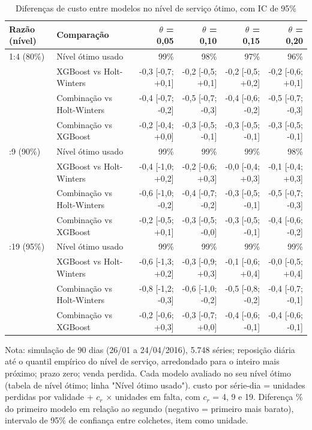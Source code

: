 \begin{table}[htbp]
\centering
\small
\caption{Diferenças de custo entre modelos no nível de serviço ótimo, com IC de 95\%}
\label{tab:sim_diferencas_otimo}
\begin{tabular}{llrrrr}
\toprule
Razão (nível) & Comparação & $\theta$ = 0,05 & $\theta$ = 0,10 & $\theta$ = 0,15 & $\theta$ = 0,20 \\
\midrule
1:4 (80\%) & Nível ótimo usado & 99\% & 98\% & 97\% & 96\% \\
 & XGBoost vs Holt-Winters & -0,3 [-0,7; +0,1] & -0,2 [-0,5; +0,1] & -0,2 [-0,5; +0,2] & -0,2 [-0,6; +0,1] \\
 & Combinação vs Holt-Winters & -0,4 [-0,7; -0,2] & -0,5 [-0,7; -0,3] & -0,4 [-0,6; -0,2] & -0,5 [-0,7; -0,3] \\
 & Combinação vs XGBoost & -0,2 [-0,4; +0,0] & -0,3 [-0,5; -0,1] & -0,3 [-0,5; -0,1] & -0,3 [-0,5; -0,1] \\
\addlinespace
1:9 (90\%) & Nível ótimo usado & 99\% & 99\% & 99\% & 98\% \\
 & XGBoost vs Holt-Winters & -0,4 [-1,0; +0,2] & -0,2 [-0,6; +0,3] & -0,0 [-0,4; +0,3] & -0,1 [-0,4; +0,3] \\
 & Combinação vs Holt-Winters & -0,6 [-1,0; -0,2] & -0,4 [-0,7; -0,2] & -0,3 [-0,5; -0,1] & -0,5 [-0,7; -0,3] \\
 & Combinação vs XGBoost & -0,2 [-0,5; +0,1] & -0,3 [-0,5; -0,0] & -0,3 [-0,5; -0,1] & -0,4 [-0,6; -0,2] \\
\addlinespace
1:19 (95\%) & Nível ótimo usado & 99\% & 99\% & 99\% & 99\% \\
 & XGBoost vs Holt-Winters & -0,6 [-1,3; +0,2] & -0,3 [-0,9; +0,3] & -0,1 [-0,6; +0,4] & -0,0 [-0,5; +0,4] \\
 & Combinação vs Holt-Winters & -0,8 [-1,2; -0,3] & -0,6 [-1,0; -0,2] & -0,5 [-0,8; -0,2] & -0,4 [-0,7; -0,1] \\
 & Combinação vs XGBoost & -0,2 [-0,6; +0,3] & -0,3 [-0,7; +0,0] & -0,4 [-0,6; -0,1] & -0,4 [-0,6; -0,1] \\
\bottomrule
\end{tabular}
\par\smallskip
{\footnotesize Nota: simulação de 90 dias (26/01 a 24/04/2016), 5.748 séries; reposição diária até o quantil empírico do nível de serviço, arredondado para o inteiro mais próximo; prazo zero; venda perdida. Cada modelo avaliado no seu nível ótimo (tabela de nível ótimo; linha "Nível ótimo usado"). custo por série-dia = unidades perdidas por validade + $c_r$ × unidades em falta, com $c_r$ = 4, 9 e 19. Diferença \% do primeiro modelo em relação ao segundo (negativo = primeiro mais barato), intervalo de 95\% de confiança entre colchetes, item como unidade.}
\end{table}
